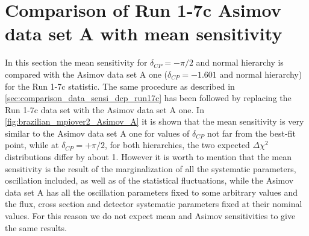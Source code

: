 
%
%


\section {Comparison of Run 1-7c Asimov data set A with mean sensitivity}
\label{app:brazilian_asimov_mean_dcp_run17c}


In this section the mean sensitivity for $\delta_{CP} = -\pi /2$ and normal hierarchy
is compared with the Asimov data set A one ($\delta_{CP} = -1.601$ and normal hierarchy) 
for the Run 1-7c statistic.
The same procedure as described in \cref{sec:comparison_data_sensi_dcp_run17c} has been followed
by replacing the Run 1-7c data set with the Asimov data set A one.
In \cref{fig:brazilian_mpiover2_Asimov_A} it is shown that the mean sensitivity is very 
similar to the Asimov data set A one 
for values of $\delta_{CP}$ not far from the best-fit point,
while at $\delta_{CP} = +\pi/2$, for both hierarchies, the two expected 
$\Delta \chi^2$ distributions differ by about 1.
However it is worth to mention that the mean sensitivity is the result of the marginalization
of all the systematic parameters, oscillation included,
as well as of the statistical fluctuations,
while the Asimov data set A has 
all the oscillation parameters fixed to some arbitrary values
and the flux, cross section and detector systematic parameters fixed at their nominal values.
For this reason we do not expect mean and Asimov sensitivities to 
give the same results.

